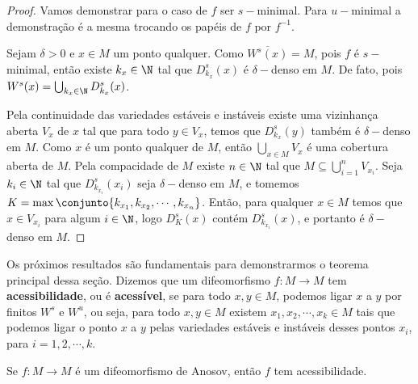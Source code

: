 \begin{proof} Vamos demonstrar para o caso de $f$ ser $s-$minimal. Para $u-$minimal a demonstração é a mesma trocando os papéis de $f$ por $f^{
-1}$.

Sejam $\delta>0$ e $x\in M$ um ponto qualquer. Como $\overline{W^{s}(x)}=M$, pois $f$ é $s-$minimal, então existe $k_x\in\N$ tal que $D_{k_x}^{s}(x)$ é $\delta-$denso em $M$. De fato, pois $W^{s}(x)=\bigcup_{k_x\in\N}D_{k_x}^{s}(x)$.

Pela continuidade das variedades estáveis e instáveis existe uma vizinhança aberta $V_x$ de $x$ tal que para todo $y\in V_x$, temos que $D_{k_x}^{s}(y)$ também é $\delta-$denso em $M$. Como $x$ é um ponto qualquer de $M$, então $\bigcup_{x\in M}{V_x}$ é uma cobertura aberta de $M$. Pela compacidade de $M$ existe $n\in \N$ tal que $M\subseteq \bigcup_{i=1}^{n}{V_{x_i}}$. Seja $k_i\in \N$ tal que $D_{k_{x_i}}^{s}(x_i)$ seja $\delta-$denso em $M$, e tomemos $K=\max\conjunto{k_{x_1},k_{x_2},\cdots,k_{x_n}}$. Então, para qualquer $x\in M$ temos que $x\in V_{x_i}$ para algum $i\in\N$, logo $D_{K}^{s}(x)$ contém $D_{k_{x_i}}^{s}(x)$, e portanto é $\delta-$denso em $M$.
\end{proof}

Os próximos resultados são fundamentais para demonstrarmos o teorema principal dessa seção. Dizemos que um difeomorfismo $f:M\to M$ tem \textbf{acessibilidade}, ou é \textbf{acessível}, se para todo $x,y\in M$, podemos ligar $x$ a $y$ por finitos $W^s$ e $W^u$, ou seja, para todo $x,y\in M$ existem $x_1,x_2,\cdots,x_k\in M$ tais que podemos ligar o ponto $x$ a $y$ pelas variedades estáveis e instáveis desses pontos $x_i$, para $i=1,2,\cdots,k$.

\begin{proposicao}\label{ligafinita} Se $f:M\to M$ é um difeomorfismo de Anosov, então $f$ tem acessibilidade. 
\end{proposicao}


